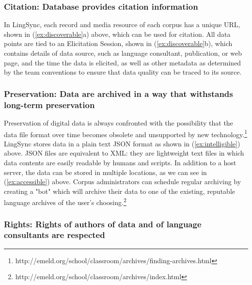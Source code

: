 \documentclass[letterpaper, 12pt, dvips]{mitwpl}
\begin{document}
\subsubsection{\textbf{Citation}: Database provides citation information} 
 
In LingSync, each record  and media resource of each corpus has a unique URL, shown in (\ref{ex:discoverable}a) above, which can be used for citation. 
All data points are tied to an Elicitation Session, shown in (\ref{ex:discoverable}b), which contains details of data source, such as language consultant, publication, or web page, and the time the data is elicited, as well as other metadata as determined by the team conventions to ensure that data quality can be traced to its source. 

\subsubsection{\textbf{Preservation}: Data are archived in a way that withstands long-term preservation}

Preservation of digital data is always confronted with the possibility that the data file format over time becomes obsolete and unsupported by new technology.\footnote{http://emeld.org/school/classroom/archives/finding-archives.html} LingSync stores data in a plain text JSON format  as shown in (\ref{ex:intelligible}) above. 
JSON files  are equivalent to XML: they are lightweight text files in which data contents are easily readable by humans and scripts. In addition to a host server, the data can be stored in multiple locations, as we can see in  (\ref{ex:accessible}) above. 
Corpus administrators  can schedule regular archiving by creating a "bot" which will archive their data to one of the existing, reputable language archives of the user's choosing.\footnote{http://emeld.org/school/classroom/archives/index.html} 


\subsubsection{\textbf{Rights}: Rights of authors of data and of language consultants are respected}
\end{document}
